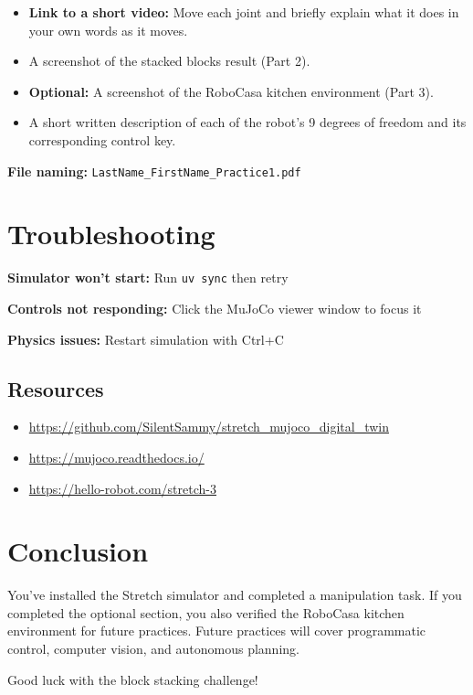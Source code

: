 \documentclass[11pt,a4paper]{article}
\begin{document}
\begin{itemize}
    \item \textbf{Link to a short video:} Move each joint and briefly explain what it does in your own words as it moves.
    \item A screenshot of the stacked blocks result (Part 2).
    \item \textbf{Optional:} A screenshot of the RoboCasa kitchen environment (Part 3).
    \item A short written description of each of the robot's 9 degrees of freedom and its corresponding control key.
\end{itemize}

\textbf{File naming:} \texttt{LastName\_FirstName\_Practice1.pdf}

\section{Troubleshooting}

\textbf{Simulator won't start:} Run \texttt{uv sync} then retry

\textbf{Controls not responding:} Click the MuJoCo viewer window to focus it

\textbf{Physics issues:} Restart simulation with Ctrl+C

\subsection{Resources}

\begin{itemize}
    \item \url{https://github.com/SilentSammy/stretch_mujoco_digital_twin}
    \item \url{https://mujoco.readthedocs.io/}
    \item \url{https://hello-robot.com/stretch-3}
\end{itemize}

\section{Conclusion}

You've installed the Stretch simulator and completed a manipulation task. If you completed the optional section, you also verified the RoboCasa kitchen environment for future practices. Future practices will cover programmatic control, computer vision, and autonomous planning.

Good luck with the block stacking challenge!
\end{document}
